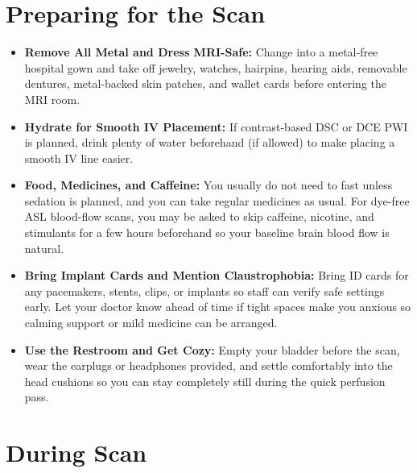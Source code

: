 \section{Preparing for the Scan}

\begin{itemize}
    \item \textbf{Remove All Metal and Dress MRI-Safe:} Change into a metal-free hospital gown and take off jewelry, watches, hairpins, hearing aids, removable dentures, metal-backed skin patches, and wallet cards before entering the MRI room.
    \item \textbf{Hydrate for Smooth IV Placement:} If contrast-based DSC or DCE PWI is planned, drink plenty of water beforehand (if allowed) to make placing a smooth IV line easier.
    \item \textbf{Food, Medicines, and Caffeine:} You usually do not need to fast unless sedation is planned, and you can take regular medicines as usual. For dye-free ASL blood-flow scans, you may be asked to skip caffeine, nicotine, and stimulants for a few hours beforehand so your baseline brain blood flow is natural.
    \item \textbf{Bring Implant Cards and Mention Claustrophobia:} Bring ID cards for any pacemakers, stents, clips, or implants so staff can verify safe settings early. Let your doctor know ahead of time if tight spaces make you anxious so calming support or mild medicine can be arranged.
    \item \textbf{Use the Restroom and Get Cozy:} Empty your bladder before the scan, wear the earplugs or headphones provided, and settle comfortably into the head cushions so you can stay completely still during the quick perfusion pass.
\end{itemize}

\section{During Scan}

